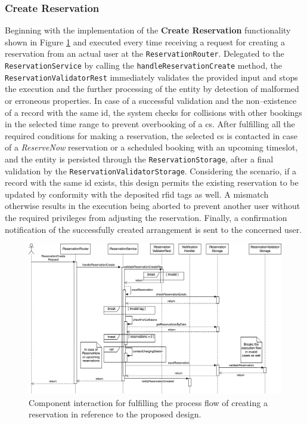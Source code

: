 \subsubsection{Create Reservation}
\label{ch:Implementation:sec:Reservation System:ssec:Management Capabilities:sssec:Create Reservation}

Beginning with the implementation of the \textbf{Create Reservation} functionality shown in Figure \ref{fig:create-reservation-seqflow} and executed every time receiving a request for creating a reservation from an actual user at the \texttt{ReservationRouter}. 
Delegated to the \texttt{ReservationService} by calling the \texttt{handleReservationCreate} method, the \texttt{ReservationValidatorRest} immediately validates the provided input and stops the execution and the further processing of the entity by detection of malformed or erroneous properties.
In case of a successful validation and the non--existence of a record with the same \acrshort{id}, the system checks for collisions with other bookings in the selected time range to prevent overbooking of a \acrshort{cs}.
After fulfilling all the required conditions for making a reservation, the selected \acrshort{cs} is contacted in case of a \textit{ReserveNow} reservation or a scheduled booking with an upcoming timeslot, and the entity is persisted through the \texttt{ReservationStorage}, after a final validation by the \texttt{ReservationValidatorStorage}.
Considering the scenario, if a record with the same \acrshort{id} exists, this design permits the existing reservation to be updated by conformity with the deposited \acrshort{rfid} tags as well. A mismatch otherwise results in the execution being aborted to prevent another user without the required privileges from adjusting the reservation.
Finally, a confirmation notification of the successfully created arrangement is sent to the concerned user.

\begin{figure}[h]
    \centering
    \includegraphics[scale=0.4]{resources/images/main/6_implementation/processes/ReservationCreate.png}
    \caption{Component interaction for fulfilling the process flow of creating a reservation in reference to the proposed design.}
    \label{fig:create-reservation-seqflow}
\end{figure}

